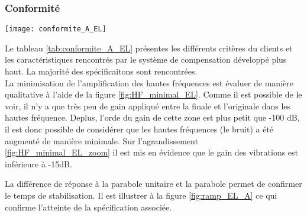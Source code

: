 \documentclass{udes_rapport} %
\begin{document}
\subsubsection{Conformité}
\begin{center}
  \label{tab:conformite_A_EL}
  \texttt{[image: conformite\_A\_EL]}
\end{center}
Le tableau \ref{tab:conformite_A_EL} présentes les différents critères du clients et les caractéristiques rencontrés par le système de compensation développé plus haut. La majorité des spécificaitons sont rencontrées.\\
La minimisation de l'amplification des hautes fréquences est évaluer de manière qualitative à l'aide de la figure \ref{fig:HF_minimal_EL}. Comme il est possible de le voir, il n'y a que très peu de gain appliqué entre la finale et l'originale dans les hautes fréquence. Deplus, l'orde du gain de cette zone est plus petit que -100 dB, il est donc possible de considérer que les hautes fréquences (le bruit) a été augmenté de manière minimale. Sur l'agrandissement \ref{fig:HF_minimal_EL_zoom} il est mis en évidence que le gain des vibrations est inférieure à -15dB.


La différence de réponse à la parabole unitaire et la parabole permet de confirmer le temps de stabilisation. Il est illustrer à la figure \ref{fig:ramp_EL_A} ce qui confirme l'atteinte de la spécification associée.
\end{document}

